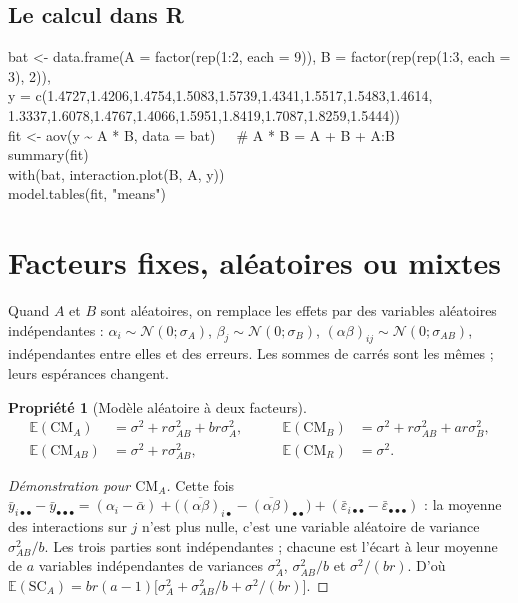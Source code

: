 \documentclass[11pt,a4paper]{article}
\theoremstyle{sj}
\newtheorem{prop}[thm]{Propriété}
\theoremstyle{definition}
\theoremstyle{remark}
\newcommand{\E}{\mathbb{E}}
\newcommand{\N}{\mathcal{N}}
\newcommand{\SC}{\mathrm{SC}}
\newcommand{\CM}{\mathrm{CM}}
\newcommand{\ybar}{\bar y}
\newcommand{\dotp}{{\scriptscriptstyle\bullet}}
\begin{document}
\subsection{Le calcul dans R}

\begin{code}
bat <- data.frame(A = factor(rep(1:2, each = 9)), B = factor(rep(rep(1:3, each = 3), 2)),\\
\hspace*{2em}y = c(1.4727,1.4206,1.4754,1.5083,1.5739,1.4341,1.5517,1.5483,1.4614,\\
\hspace*{4em}1.3337,1.6078,1.4767,1.4066,1.5951,1.8419,1.7087,1.8259,1.5444))\\
fit <- aov(y \textasciitilde{} A * B, data = bat)\ \ \ \# A * B = A + B + A:B\\
summary(fit)\\
with(bat, interaction.plot(B, A, y))\\
model.tables(fit, "means")
\end{code}

\section{Facteurs fixes, aléatoires ou mixtes}\label{sec:aleatoire}

Quand $A$ et $B$ sont aléatoires, on remplace les effets par des variables aléatoires indépendantes : $\alpha_i\sim\N(0;\sigma_A)$, $\beta_j\sim\N(0;\sigma_B)$, $(\alpha\beta)_{ij}\sim\N(0;\sigma_{AB})$, indépendantes entre elles et des erreurs. Les sommes de carrés sont les mêmes ; leurs espérances changent.

\begin{prop}[Modèle aléatoire à deux facteurs]\label{prop:EMSalea}
\[
\begin{aligned}
\E(\CM_A)&=\sigma^2+r\sigma_{AB}^2+br\sigma_A^2, &\qquad
\E(\CM_B)&=\sigma^2+r\sigma_{AB}^2+ar\sigma_B^2,\\
\E(\CM_{AB})&=\sigma^2+r\sigma_{AB}^2, &\qquad
\E(\CM_R)&=\sigma^2.
\end{aligned}
\]
\end{prop}

\begin{proof}[Démonstration pour $\CM_A$]
Cette fois $\ybar_{i\dotp\dotp}-\ybar_{\dotp\dotp\dotp}=(\alpha_i-\bar\alpha)+\big(\overline{(\alpha\beta)}_{i\dotp}-\overline{(\alpha\beta)}_{\dotp\dotp}\big)+(\bar\varepsilon_{i\dotp\dotp}-\bar\varepsilon_{\dotp\dotp\dotp})$ : la moyenne des interactions sur $j$ n'est plus nulle, c'est une variable aléatoire de variance $\sigma_{AB}^2/b$. Les trois parties sont indépendantes ; chacune est l'écart à leur moyenne de $a$ variables indépendantes de variances $\sigma_A^2$, $\sigma_{AB}^2/b$ et $\sigma^2/(br)$. D'où $\E(\SC_A)=br(a-1)\big[\sigma_A^2+\sigma_{AB}^2/b+\sigma^2/(br)\big]$.
\end{proof}
\end{document}
